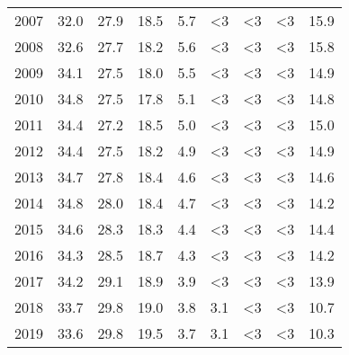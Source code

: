 \begin{tabular}{lrrrrrrrr}
2007 &              32.0 &         27.9 &            18.5 &                    5.7 &                  <3 &                 <3 &             <3 &   15.9 \\
2008 &              32.6 &         27.7 &            18.2 &                    5.6 &                  <3 &                 <3 &             <3 &   15.8 \\
2009 &              34.1 &         27.5 &            18.0 &                    5.5 &                  <3 &                 <3 &             <3 &   14.9 \\
2010 &              34.8 &         27.5 &            17.8 &                    5.1 &                  <3 &                 <3 &             <3 &   14.8 \\
2011 &              34.4 &         27.2 &            18.5 &                    5.0 &                  <3 &                 <3 &             <3 &   15.0 \\
2012 &              34.4 &         27.5 &            18.2 &                    4.9 &                  <3 &                 <3 &             <3 &   14.9 \\
2013 &              34.7 &         27.8 &            18.4 &                    4.6 &                  <3 &                 <3 &             <3 &   14.6 \\
2014 &              34.8 &         28.0 &            18.4 &                    4.7 &                  <3 &                 <3 &             <3 &   14.2 \\
2015 &              34.6 &         28.3 &            18.3 &                    4.4 &                  <3 &                 <3 &             <3 &   14.4 \\
2016 &              34.3 &         28.5 &            18.7 &                    4.3 &                  <3 &                 <3 &             <3 &   14.2 \\
2017 &              34.2 &         29.1 &            18.9 &                    3.9 &                  <3 &                 <3 &             <3 &   13.9 \\
2018 &              33.7 &         29.8 &            19.0 &                    3.8 &                 3.1 &                 <3 &             <3 &   10.7 \\
2019 &              33.6 &         29.8 &            19.5 &                    3.7 &                 3.1 &                 <3 &             <3 &   10.3 \\
\bottomrule
\end{tabular}
